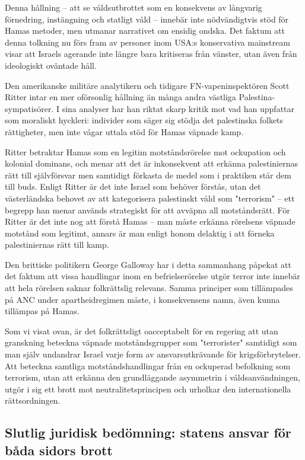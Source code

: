Denna hållning – att se våldsutbrottet som en konsekvens av långvarig förnedring, instängning och statligt våld –
innebär inte nödvändigtvis stöd för Hamas metoder, men utmanar narrativet om ensidig ondska. Det faktum att denna
tolkning nu förs fram av personer inom USA:s konservativa mainstream visar att Israels agerande inte längre bara
kritiseras från vänster, utan även från ideologiskt oväntade håll.

Den amerikanske militäre analytikern och tidigare FN-vapeninspektören Scott Ritter intar en mer
oförsonlig hållning än många andra västliga Palestina-sympatisörer. I sina analyser har han riktat
skarp kritik mot vad han uppfattar som moraliskt hyckleri: individer som säger sig stödja det
palestinska folkets rättigheter, men inte vågar uttala stöd för Hamas väpnade kamp.

Ritter betraktar Hamas som en legitim motståndsrörelse mot ockupation och kolonial dominans,
och menar att det är inkonsekvent att erkänna palestiniernas rätt till självförsvar men samtidigt
förkasta de medel som i praktiken står dem till buds. Enligt Ritter är det inte Israel som
behöver förstås, utan det västerländska behovet av att kategorisera palestinskt våld som "terrorism"
– ett begrepp han menar används strategiskt för att avväpna all motståndsrätt.
För Ritter är det inte nog att förstå Hamas – man måste erkänna rörelsens väpnade
motstånd som legitimt, annars är man enligt honom delaktig i att förneka palestiniernas rätt till kamp.

Den brittiske politikern George Galloway har i detta sammanhang påpekat att det faktum att vissa handlingar
inom en befrielserörelse utgör terror inte innebär att hela rörelsen saknar folkrättslig relevans. Samma
principer som tillämpades på ANC under apartheidregimen måste, i konsekvensens namn, även kunna tillämpas
på Hamas.

Som vi visat ovan, är det folkrättsligt oacceptabelt för en regering att utan granskning beteckna väpnade
motståndsgrupper som "terrorister" samtidigt som man själv undandrar Israel varje form av ansvarsutkrävande
för krigsförbrytelser. Att beteckna samtliga motståndshandlingar från en ockuperad befolkning som terrorism,
utan att erkänna den grundläggande asymmetrin i våldsanvändningen, utgör i sig ett brott mot neutralitetsprincipen
och urholkar den internationella rättsordningen.

\subsection*{Slutlig juridisk bedömning: statens ansvar för båda sidors brott}

